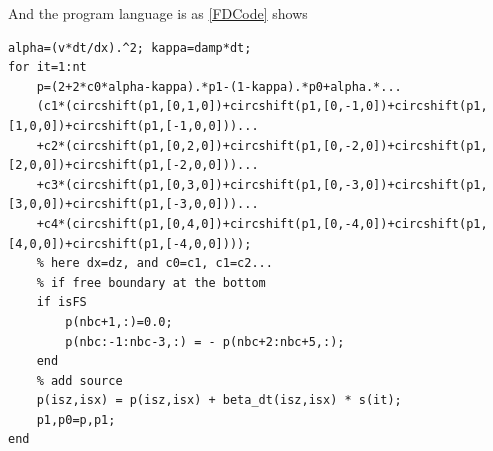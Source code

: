 \documentclass[a4paper]{article}
\begin{document}
		And the program language is as \autoref{FDCode} shows
		\begin{lstlisting}[caption=set ABC to the velocity variable (2 is same), label=FDCode,basicstyle=\tiny, numberstyle=\tiny]
% 
alpha=(v*dt/dx).^2; kappa=damp*dt;
for it=1:nt
	p=(2+2*c0*alpha-kappa).*p1-(1-kappa).*p0+alpha.*...
	(c1*(circshift(p1,[0,1,0])+circshift(p1,[0,-1,0])+circshift(p1,[1,0,0])+circshift(p1,[-1,0,0]))...
	+c2*(circshift(p1,[0,2,0])+circshift(p1,[0,-2,0])+circshift(p1,[2,0,0])+circshift(p1,[-2,0,0]))...
	+c3*(circshift(p1,[0,3,0])+circshift(p1,[0,-3,0])+circshift(p1,[3,0,0])+circshift(p1,[-3,0,0]))...
	+c4*(circshift(p1,[0,4,0])+circshift(p1,[0,-4,0])+circshift(p1,[4,0,0])+circshift(p1,[-4,0,0]))); 
	% here dx=dz, and c0=c1, c1=c2...
	% if free boundary at the bottom
	if isFS
		p(nbc+1,:)=0.0;
		p(nbc:-1:nbc-3,:) = - p(nbc+2:nbc+5,:);
	end
	% add source
	p(isz,isx) = p(isz,isx) + beta_dt(isz,isx) * s(it);
	p1,p0=p,p1;
end
    	\end{lstlisting}
\end{document}
